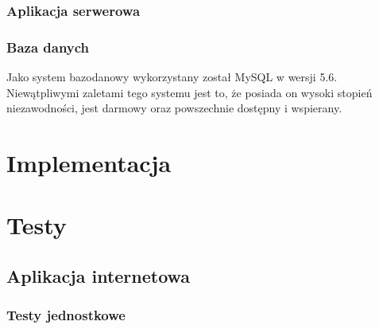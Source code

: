\documentclass[eng,oneside]{mgr}
\begin{document}
\subsection{Aplikacja serwerowa} %
\label{sub:aplikacja_serwerowa}


\subsection{Baza danych}
Jako system bazodanowy wykorzystany został MySQL w wersji 5.6. Niewątpliwymi zaletami tego systemu jest to, że posiada on wysoki stopień niezawodności, jest darmowy oraz powszechnie dostępny i wspierany.

\chapter{Implementacja}
\chapter{Testy}
\section{Aplikacja internetowa}
\subsection{Testy jednostkowe}

\end{document}
